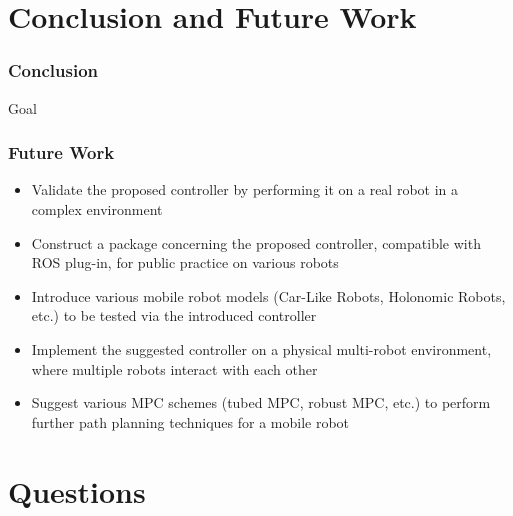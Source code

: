 \section{Conclusion and Future Work}
	
	\begin{frame}
		\frametitle{Conclusion}
		\begin{CheckList}{Goal}
			\pause
			\pause
			\pause
			\pause
			\pause
		\end{CheckList}
	\end{frame}

	\begin{frame}
		\frametitle{Future Work}
		\begin{itemize}
			\item Validate the proposed controller by performing it on a real robot in a complex environment \\ [0.5cm]
			\pause
			\item Construct a package concerning the proposed controller, compatible with ROS plug-in, for public practice on various robots \\ [0.5cm]
			\pause
			\item Introduce various mobile robot models (Car-Like Robots, Holonomic Robots, etc.) to be tested via the introduced controller \\ [0.5cm]
			\pause
			\item Implement the suggested controller on a physical multi-robot environment, where multiple robots interact with each other \\ [0.5cm]
			\pause
			\item Suggest various MPC schemes (tubed MPC, robust MPC, etc.) to perform further path planning techniques for a mobile robot
		\end{itemize}
	\end{frame}

\section{Questions}
